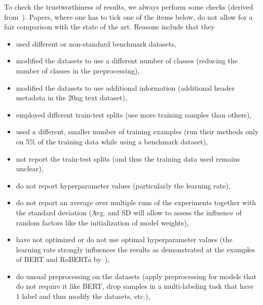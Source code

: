 \documentclass[sigconf, nonacm]{acmart}
\begin{document}
\begin{tcolorbox}[title=Instructions]
To check the trustworthiness of results, we always perform some checks (derived from~\cite{DBLP:journals/corr/abs-2204-03954v5-textclassification}).
%
Papers, where one has to tick one of the items below, do not allow for a fair comparison with the state of the art.
Reasons include that they 

\begin{itemize}
\item used different or non-standard benchmark datasets,

\item modified the datasets to use a different number of classes (\ie reducing the number of classes in the preprocessing),

\item modified the datasets to use additional information (\eg additional header metadata in the 20ng text dataset),

\item employed different train-test splits (\eg use more training samples than others), 

\item used a different, smaller number of training examples (\eg run their methods only on 5\% of the training data while using a benchmark dataset),

\item not report the train-test splits (and thus the training data used remains unclear),

\item do not report hyperparameter values (particularly the learning rate), 

\item do not report an average over multiple runs of the experiments together with the standard deviation (Avg. and SD will allow to assess the influence of random factors like the initialization of model weights),  

\item have not optimized or do not use optimal hyperparameter values (\eg the learning rate strongly influences the results as demonstrated at the examples of BERT and RoBERTa by~\citet{DBLP:journals/corr/abs-2204-03954v5-textclassification}), 

\item do unsual preprocessing on the datasets (\eg apply preprocessing for models that do not require it like BERT, drop samples in a multi-labeling task that have $1$ label and thus modify the datasets, etc.),
%


\end{itemize}
\end{tcolorbox}
\end{document}
